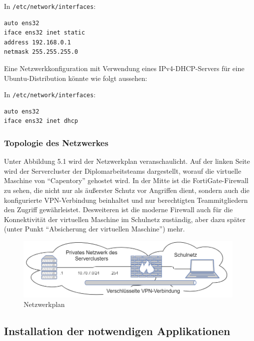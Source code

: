 In \texttt{/etc/network/interfaces}:

\begin{verbatim}
auto ens32
iface ens32 inet static
address 192.168.0.1
netmask 255.255.255.0
\end{verbatim}

Eine Netzwerkkonfiguration mit Verwendung eines IPv4-DHCP-Servers für
eine Ubuntu-Distribution könnte wie folgt aussehen:

In \texttt{/etc/network/interfaces}:

\begin{verbatim}
auto ens32
iface ens32 inet dhcp
\end{verbatim}

\hypertarget{topologie-des-netzwerkes}{%
\subsubsection{Topologie des
Netzwerkes}\label{topologie-des-netzwerkes}}

Unter Abbildung 5.1 wird der Netzwerkplan veranschaulicht. Auf der
linken Seite wird der Servercluster der Diplomarbeitsteams dargestellt,
worauf die virtuelle Maschine von ``Capentory'' gehostet wird. In der
Mitte ist die FortiGate-Firewall zu sehen, die nicht nur als äußerster
Schutz vor Angriffen dient, sondern auch die konfigurierte
VPN-Verbindung beinhaltet und nur berechtigten Teammitgliedern den
Zugriff gewährleistet. Desweiteren ist die moderne Firewall auch für die
Konnektivität der virtuellen Maschine im Schulnetz zuständig, aber dazu
später (unter Punkt ``Absicherung der virtuellen Maschine'') mehr.

\begin{figure}[ht]
\centering
\includegraphics{topo1.png}
\caption{Netzwerkplan}
\end{figure}

\hypertarget{installation-der-notwendigen-applikationen}{%
\subsection{Installation der notwendigen
Applikationen}\label{installation-der-notwendigen-applikationen}}

